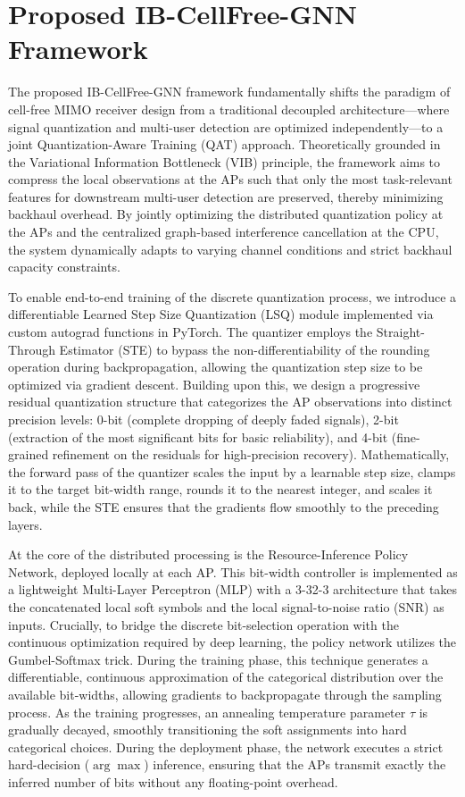 \section{Proposed IB-CellFree-GNN Framework}

The proposed IB-CellFree-GNN framework fundamentally shifts the paradigm of cell-free MIMO receiver design from a traditional decoupled architecture---where signal quantization and multi-user detection are optimized independently---to a joint Quantization-Aware Training (QAT) approach. Theoretically grounded in the Variational Information Bottleneck (VIB) principle, the framework aims to compress the local observations at the APs such that only the most task-relevant features for downstream multi-user detection are preserved, thereby minimizing backhaul overhead. By jointly optimizing the distributed quantization policy at the APs and the centralized graph-based interference cancellation at the CPU, the system dynamically adapts to varying channel conditions and strict backhaul capacity constraints.

To enable end-to-end training of the discrete quantization process, we introduce a differentiable Learned Step Size Quantization (LSQ) module implemented via custom autograd functions in PyTorch. The quantizer employs the Straight-Through Estimator (STE) to bypass the non-differentiability of the rounding operation during backpropagation, allowing the quantization step size to be optimized via gradient descent. Building upon this, we design a progressive residual quantization structure that categorizes the AP observations into distinct precision levels: 0-bit (complete dropping of deeply faded signals), 2-bit (extraction of the most significant bits for basic reliability), and 4-bit (fine-grained refinement on the residuals for high-precision recovery). Mathematically, the forward pass of the quantizer scales the input by a learnable step size, clamps it to the target bit-width range, rounds it to the nearest integer, and scales it back, while the STE ensures that the gradients flow smoothly to the preceding layers.

At the core of the distributed processing is the Resource-Inference Policy Network, deployed locally at each AP. This bit-width controller is implemented as a lightweight Multi-Layer Perceptron (MLP) with a 3-32-3 architecture that takes the concatenated local soft symbols and the local signal-to-noise ratio (SNR) as inputs. Crucially, to bridge the discrete bit-selection operation with the continuous optimization required by deep learning, the policy network utilizes the Gumbel-Softmax trick. During the training phase, this technique generates a differentiable, continuous approximation of the categorical distribution over the available bit-widths, allowing gradients to backpropagate through the sampling process. As the training progresses, an annealing temperature parameter $\tau$ is gradually decayed, smoothly transitioning the soft assignments into hard categorical choices. During the deployment phase, the network executes a strict hard-decision ($\arg\max$) inference, ensuring that the APs transmit exactly the inferred number of bits without any floating-point overhead.

